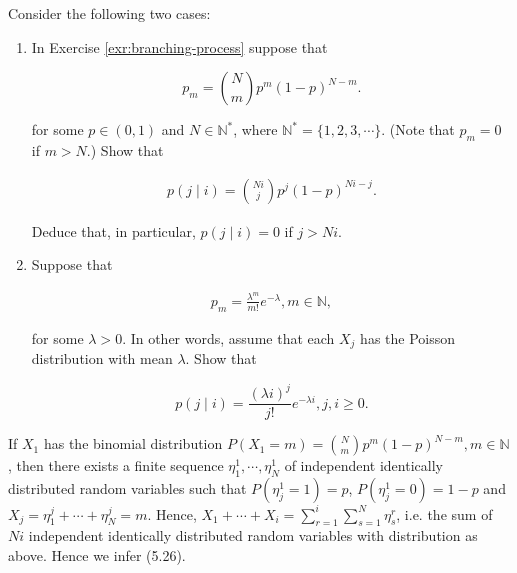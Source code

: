 \begin{Exercise}
\label{exr:branching-binomial-poisson}
Consider the following two cases:

\begin{enumerate}
\item In Exercise \ref{exr:branching-process} suppose that

\begin{equation}
p_m = \binom{N}{m} p^m (1-p)^{N-m}.
\end{equation}

for some $p\in(0,1)$ and $N\in\mathbb{N}^*$, where $\mathbb{N}^* = \{1,2,3,\cdots\}$. (Note that $p_m = 0$ if $m > N$.) Show that

\begin{align}
p(j \mid i) = \binom{Ni}{j} p^j (1-p)^{Ni-j}. \tag{5.26}
\end{align}

Deduce that, in particular, $p(j \mid i) = 0$ if $j > Ni$.

\item Suppose that

\begin{align}
p_m = \frac{\lambda^m}{m!} e^{-\lambda}, m\in\mathbb{N},
\end{align}

for some $\lambda > 0$. In other words, assume that each $X_j$ has the Poisson distribution with mean $\lambda$. Show that

\begin{equation}
p(j \mid i) = \frac{(\lambda i)^j}{j!} e^{-\lambda i}, j,i \geq 0. \tag{5.27}
\end{equation}
\end{enumerate}

\begin{hint}
If $X_1$ has the binomial distribution $P(X_1=m) = \binom{N}{m}p^m(1-p)^{N-m}, m\in\mathbb{N}$, then there exists a finite sequence $\eta_1^1, \cdots, \eta_N^1$ of independent identically distributed random variables such that $P(\eta_j^1 = 1) = p$, $P(\eta_j^1 = 0) = 1-p$ and $X_j = \eta_1^j + \cdots + \eta_N^j = m$. Hence, $X_1 + \cdots + X_i = \sum_{r=1}^i \sum_{s=1}^N \eta_s^r$, i.e. the sum of $Ni$ independent identically distributed random variables with distribution as above. Hence we infer (5.26).
\end{hint}
\end{Exercise}

